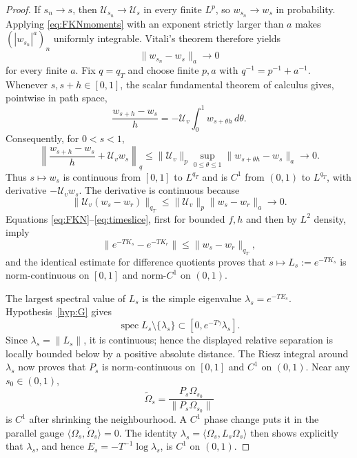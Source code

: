 \documentclass[11pt,a4paper]{article}
\theoremstyle{remark}
\newcommand{\Om}{\Omega}
\DeclareMathOperator{\spec}{spec}
\begin{document}
\begin{proof}
If $s_n\to s$, then $\mathcal U_{s_n}\to\mathcal U_s$ in every finite $L^p$, so
$w_{s_n}\to w_s$ in probability.  Applying \eqref{eq:FKNmoments} with an exponent strictly
larger than $a$ makes $(|w_{s_n}|^a)_n$ uniformly integrable.  Vitali's theorem therefore yields
\begin{equation}\label{eq:FKNweightcontinuity}
 \|w_{s_n}-w_s\|_a\longrightarrow0                         \tag{1.4}
\end{equation}
for every finite $a$.  Fix $q=q_T$ and choose finite $p,a$ with
$q^{-1}=p^{-1}+a^{-1}$.  Whenever $s,s+h\in[0,1]$, the scalar fundamental theorem of calculus
gives, pointwise in path space,
\[
 \frac{w_{s+h}-w_s}{h}
 =-\mathcal U_v\int_0^1w_{s+\theta h}\,d\theta.
\]
Consequently, for $0<s<1$,
\[
 \left\|\frac{w_{s+h}-w_s}{h}+\mathcal U_vw_s\right\|_q
 \le \|\mathcal U_v\|_p
       \sup_{0\le\theta\le1}\|w_{s+\theta h}-w_s\|_a
 \longrightarrow0.
\]
Thus $s\mapsto w_s$ is continuous from $[0,1]$ to $L^{q_T}$ and is $C^1$ from $(0,1)$ to
$L^{q_T}$, with derivative $-\mathcal U_vw_s$.  The derivative is continuous because
\[
 \|\mathcal U_v(w_s-w_r)\|_{q_T}
 \le\|\mathcal U_v\|_p\|w_s-w_r\|_a\longrightarrow0.
\]
Equations
\eqref{eq:FKN}--\eqref{eq:timeslice}, first for bounded $f,h$ and then by $L^2$ density, imply
\[
 \|e^{-TK_s}-e^{-TK_r}\|\le\|w_s-w_r\|_{q_T},
\]
and the identical estimate for difference quotients proves that
$s\mapsto L_s:=e^{-TK_s}$ is norm-continuous on $[0,1]$ and norm-$C^1$ on $(0,1)$.

The largest spectral value of $L_s$ is the simple eigenvalue
$\lambda_s=e^{-TE_s}$.  Hypothesis~\ref{hyp:G} gives
\[
 \spec L_s\setminus\{\lambda_s\}
 \subset[0,e^{-T\gamma}\lambda_s].
\]
Since $\lambda_s=\|L_s\|$, it is continuous; hence the displayed relative separation is locally
bounded below by a positive absolute distance.  The Riesz integral around $\lambda_s$ now proves
that $P_s$ is norm-continuous on $[0,1]$ and $C^1$ on $(0,1)$.  Near any
$s_0\in(0,1)$,
\[
 \widetilde\Om_s=\frac{P_s\Om_{s_0}}{\|P_s\Om_{s_0}\|}
\]
is $C^1$ after shrinking the neighbourhood.  A $C^1$ phase change puts it in the parallel gauge
$\langle\Om_s,\dot\Om_s\rangle=0$.  The identity
$\lambda_s=\langle\Om_s,L_s\Om_s\rangle$ then shows explicitly that $\lambda_s$, and hence
$E_s=-T^{-1}\log\lambda_s$, is $C^1$ on $(0,1)$.


\end{proof}
\end{document}
